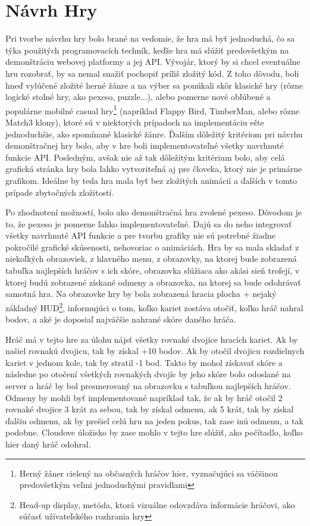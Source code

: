 \section{Návrh Hry}
Pri tvorbe návrhu hry bolo brané na vedomie, že hra má byť jednoduchá, čo sa týka použitých programovacích techník, keďže hra má slúžiť predovšetkým na demonštráciu webovej platformy a jej API. Vývojár, ktorý by si chcel eventuálne hru rozobrať, by sa nemal snažiť pochopiť príliš zložitý kód. Z toho dôvodu, boli hneď vylúčené zložité herné žánre a na výber sa ponúkali skôr klasické hry (rôzne logické stolné hry, ako pexeso, puzzle...), alebo pomerne nové obľúbené a populárne mobilné casual hry\footnote{Herný žáner cielený na občasných hráčov hier, vyznačujúci sa väčšinou predovšetkým veľmi jednoduchými pravidlami} (napríklad Flappy Bird, TimberMan, alebo rôzne Match3 klony), ktoré sú v niektorých prípadoch na implementáciu ešte jednoduchšie, ako spomínané klasické žánre. Ďalším dôležitý kritériom pri návrhu demonštračnej hry bolo, aby v hre boli implementovateľné všetky navrhnuté funkcie API. Posledným, avšak nie až tak dôležitým kritérium bolo, aby celá grafická stránka hry bola ľahko vytvoriteľná aj pre človeka, ktorý nie je primárne grafikom. Ideálne by teda hra mala byť bez zložitých animácií a ďalších v tomto prípade zbytočných zložitostí.  

Po zhodnotení možností, bolo ako demonštračná hra zvolené pexeso. Dôvodom je to, že pexeso je pomerne ľahko implementovateľné. Dajú sa do neho integrovať všetky navrhnuté API funkcie a pre tvorbu grafiky nie sú potrebné žiadne pokročilé grafické skúsenosti, nehovoriac o animáciách. Hra by sa mala skladať z niekoľkých obrazoviek, z hlavného menu, z obrazovky, na ktorej bude zobrazená tabuľka najlepších hráčov s ich skóre, obrazovka slúžiaca ako akási sieň trofejí, v ktorej budú zobrazené získané odmeny a obrazovka, na ktorej sa bude odohrávať samotná hra. Na obrazovke hry by bola zobrazená hracia plocha + nejaký základný HUD\footnote{Head-up display, metóda, ktorá vizuálne odovzdáva informácie hráčovi, ako súčasť užívateľského rozhrania hry}, informujúci o tom, koľko kariet zostáva otočiť, koľko hráč nahral bodov, a aké je doposiaľ najväčšie nahrané skóre daného hráča.

Hráč má v tejto hre za úlohu nájsť všetky rovnaké dvojice hracích kariet. Ak by našiel rovnakú dvojicu, tak by získal +10 bodov.  Ak by otočil dvojicu rozdielnych kariet v jednom kole, tak by stratil -1 bod. Takto by mohol získavať skóre a následne po otočení všetkých rovnakých dvojíc by jeho skóre bolo odoslané na server a hráč by bol presmerovaný na obrazovku s tabuľkou najlepších hráčov. Odmeny by mohli byť implementované napríklad tak, že ak by hráč otočil 2 rovnaké dvojice 3 krát za sebou, tak by získal odmenu, ak 5 krát, tak by získal ďalšiu odmenu, ak by prešiel celú hru na jeden pokus, tak zase inú odmenu, a tak podobne. Cloudove úložisko by zase mohlo v tejto hre slúžiť, ako počítadlo, koľko hier daný hráč odohral. 

